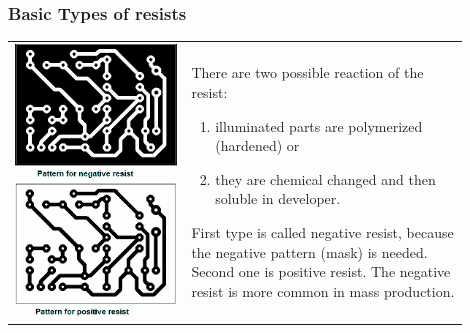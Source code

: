 \documentclass{beamer}
\begin{document}
	\begin{frame}
    \frametitle{Basic Types of resists}

		\begin{center}
			\begin{tabular}{m{0.35\linewidth} m{0.55\linewidth}}
			 \includegraphics[scale=0.9]{obr27_negativAPozitiv.png} &
				There are two possible reaction of the resist:
				
				\begin{enumerate}
					\item illuminated parts are polymerized (hardened) or
					\item they are chemical changed and then soluble in developer.
				\end{enumerate}
				First type is called negative resist, because the negative pattern (mask) is needed. Second one is positive resist. The negative resist is more common in mass production.
			\end{tabular}
		\end{center}
		
	\end{frame}
\end{document}
